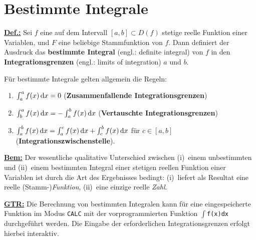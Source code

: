 \section[Bestimmte Integrale]{Bestimmte Integrale}
\medskip
\noindent
\underline{\bf Def.:} Sei $f$ eine auf dem Intervall $[a,b]
\subset D(f)$ stetige reelle Funktion einer Variablen, und $F$ eine
beliebige Stammfunktion von $f$. Dann definiert der Ausdruck
%
\be
{}
\ee
%
das {\bf bestimmte Integral} (engl.: definite integral) von $f$ in 
den {\bf Integrationsgrenzen} (engl.: limits of integration) $a$ 
und $b$.

\medskip
\noindent
F\"ur bestimmte Integrale gelten allgemein die Regeln:
%
\begin{enumerate}
\item $\int_{a}^{a}f(x)\,{\rm d}x = 0$
\hfill ({\bf Zusammenfallende Integrationsgrenzen})
\item $\int_{b}^{a}f(x)\,{\rm d}x = -\int_{a}^{b}f(x)\,{\rm d}x$
\hfill ({\bf Vertauschte Integrationsgrenzen})
\item $\int_{a}^{b}f(x)\,{\rm d}x = \int_{a}^{c}f(x)\,{\rm d}x
+ \int_{c}^{b}f(x)\,{\rm d}x$ f\"ur $c \in [a,b]$
\hfill ({\bf Integrationszwischenstelle}).
\end{enumerate}
%

\medskip
\noindent
\underline{\bf Bem:} Der wesentliche qualitative Unterschied
zwischen (i)~einem unbestimmten und (ii)~einem bestimmten
Integral einer stetigen reellen Funktion einer Variablen ist
durch die Art des Ergebnisses bedingt: (i)~liefert als Resultat
eine reelle (Stamm-){\em Funktion\/}, (ii)~eine einzige reelle
{\em Zahl\/}.

\medskip
\noindent
\underline{\bf GTR:} Die Berechnung von bestimmten Integralen
kann f\"ur eine eingespeicherte Funktion im Modus {\tt CALC} mit
der vorprogrammierten Funktion $\int${\tt f(x)dx} durchgef\"uhrt
werden. Die Eingabe der erforderlichen Integrationsgrenzen erfolgt
hierbei interaktiv.

